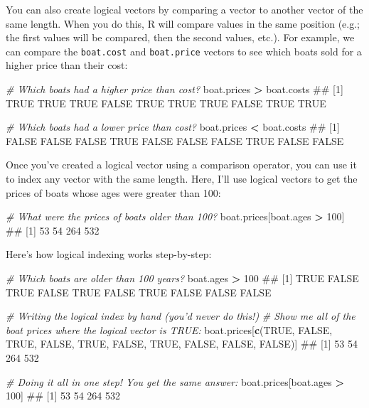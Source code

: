 \documentclass[]{book}
\newenvironment{Shaded}{\begin{snugshade}}{\end{snugshade}}
\newcommand{\KeywordTok}[1]{\textcolor[rgb]{0.13,0.29,0.53}{\textbf{#1}}}
\newcommand{\DecValTok}[1]{\textcolor[rgb]{0.00,0.00,0.81}{#1}}
\newcommand{\StringTok}[1]{\textcolor[rgb]{0.31,0.60,0.02}{#1}}
\newcommand{\CommentTok}[1]{\textcolor[rgb]{0.56,0.35,0.01}{\textit{#1}}}
\newcommand{\OtherTok}[1]{\textcolor[rgb]{0.56,0.35,0.01}{#1}}
\newcommand{\OperatorTok}[1]{\textcolor[rgb]{0.81,0.36,0.00}{\textbf{#1}}}
\newcommand{\NormalTok}[1]{#1}
\theoremstyle{definition}
\theoremstyle{definition}
\theoremstyle{remark}
\begin{document}
You can also create logical vectors by comparing a vector to another
vector of the same length. When you do this, R will compare values in
the same position (e.g.; the first values will be compared, then the
second values, etc.). For example, we can compare the \texttt{boat.cost}
and \texttt{boat.price} vectors to see which boats sold for a higher
price than their cost:

\begin{Shaded}
\begin{Highlighting}[]
\CommentTok{# Which boats had a higher price than cost?}
\NormalTok{boat.prices }\OperatorTok{>}\StringTok{ }\NormalTok{boat.costs}
\NormalTok{##  [1]  TRUE  TRUE  TRUE FALSE  TRUE  TRUE  TRUE FALSE  TRUE  TRUE}

\CommentTok{# Which boats had a lower price than cost?}
\NormalTok{boat.prices }\OperatorTok{<}\StringTok{ }\NormalTok{boat.costs}
\NormalTok{##  [1] FALSE FALSE FALSE  TRUE FALSE FALSE FALSE  TRUE FALSE FALSE}
\end{Highlighting}
\end{Shaded}

Once you've created a logical vector using a comparison operator, you
can use it to index any vector with the same length. Here, I'll use
logical vectors to get the prices of boats whose ages were greater than
100:

\begin{Shaded}
\begin{Highlighting}[]
\CommentTok{# What were the prices of boats older than 100?}
\NormalTok{boat.prices[boat.ages }\OperatorTok{>}\StringTok{ }\DecValTok{100}\NormalTok{]}
\NormalTok{## [1]  53  54 264 532}
\end{Highlighting}
\end{Shaded}

Here's how logical indexing works step-by-step:

\begin{Shaded}
\begin{Highlighting}[]
\CommentTok{# Which boats are older than 100 years?}
\NormalTok{boat.ages }\OperatorTok{>}\StringTok{ }\DecValTok{100}
\NormalTok{##  [1]  TRUE FALSE  TRUE FALSE  TRUE FALSE  TRUE FALSE FALSE FALSE}

\CommentTok{# Writing the logical index by hand (you'd never do this!)}
\CommentTok{#  Show me all of the boat prices where the logical vector is TRUE:}
\NormalTok{boat.prices[}\KeywordTok{c}\NormalTok{(}\OtherTok{TRUE}\NormalTok{, }\OtherTok{FALSE}\NormalTok{, }\OtherTok{TRUE}\NormalTok{, }\OtherTok{FALSE}\NormalTok{, }\OtherTok{TRUE}\NormalTok{, }\OtherTok{FALSE}\NormalTok{, }\OtherTok{TRUE}\NormalTok{, }\OtherTok{FALSE}\NormalTok{, }\OtherTok{FALSE}\NormalTok{, }\OtherTok{FALSE}\NormalTok{)]}
\NormalTok{## [1]  53  54 264 532}

\CommentTok{# Doing it all in one step! You get the same answer:}
\NormalTok{boat.prices[boat.ages }\OperatorTok{>}\StringTok{ }\DecValTok{100}\NormalTok{]}
\NormalTok{## [1]  53  54 264 532}
\end{Highlighting}
\end{Shaded}
\end{document}
